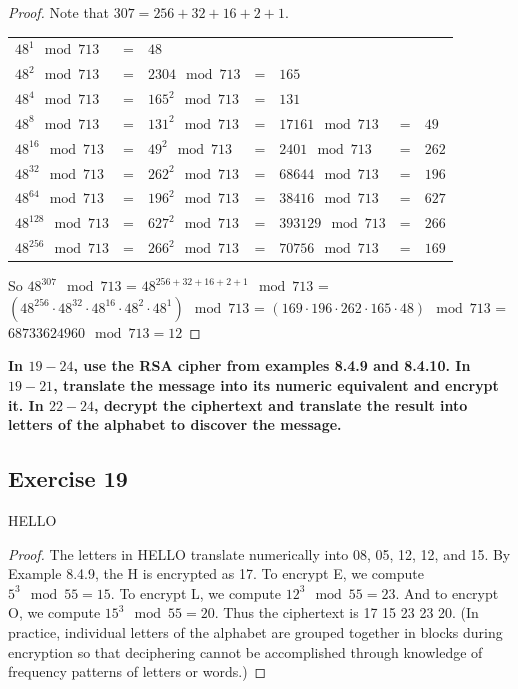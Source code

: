 \documentclass[14pt]{extarticle}
\newcommand{\cy}{\color{cyan}}
\begin{document}
\begin{proof}
        Note that \(307 = 256 + 32 + 16 + 2 + 1\).

        \begin{tabular}{lclclcl}
                \(48^1 \mod 713\)     & = & \(48\)                                                     \\
                \(48^2 \mod 713\)     & = & \(2304 \mod 713\)  & = & \(165\)                           \\
                \(48^4 \mod 713\)     & = & \(165^2 \mod 713\) & = & \(131\)                           \\
                \(48^8 \mod 713\)     & = & \(131^2 \mod 713\) & = & \(17161 \mod 713\)  & = & \(49\)  \\
                \(48^{16} \mod 713\)  & = & \(49^2 \mod 713\)  & = & \(2401 \mod 713\)   & = & \(262\) \\
                \(48^{32} \mod 713\)  & = & \(262^2 \mod 713\) & = & \(68644 \mod 713\)  & = & \(196\) \\
                \(48^{64} \mod 713\)  & = & \(196^2 \mod 713\) & = & \(38416 \mod 713\)  & = & \(627\) \\
                \(48^{128} \mod 713\) & = & \(627^2 \mod 713\) & = & \(393129 \mod 713\) & = & \(266\) \\
                \(48^{256} \mod 713\) & = & \(266^2 \mod 713\) & = & \(70756 \mod 713\)  & = & \(169\)
        \end{tabular}

        So \(48^{307} \mod 713\) = \(48^{256 + 32 + 16 + 2 + 1} \mod 713\) = \((48^{256} \cdot 48^{32} \cdot 48^{16}
        \cdot 48^{2} \cdot 48^{1}) \mod 713\) = \((169 \cdot 196 \cdot 262 \cdot 165 \cdot 48) \mod 713\) = \(68733624960
        \mod 713 = 12\)
\end{proof}

{\bf \cy In $19-24$, use the RSA cipher from examples 8.4.9 and 8.4.10. In $19-21$, translate the message into its
numeric equivalent and encrypt it. In $22-24$, decrypt the ciphertext and translate the result into letters of the
alphabet to discover the message.}

\subsection{Exercise 19}
HELLO

\begin{proof}
        The letters in HELLO translate numerically into 08, 05, 12, 12, and 15. By Example 8.4.9, the H is encrypted as 17. To
        encrypt E, we compute \(5^3 \mod 55 = 15\). To encrypt L, we compute \(12^3 \mod 55 = 23\). And to encrypt O, we
        compute \(15^3 \mod 55 = 20\). Thus the ciphertext is 17 15 23 23 20. (In practice, individual letters of the alphabet
        are grouped together in blocks during encryption so that deciphering cannot be accomplished through knowledge of
        frequency patterns of letters or words.)
\end{proof}
\end{document}
